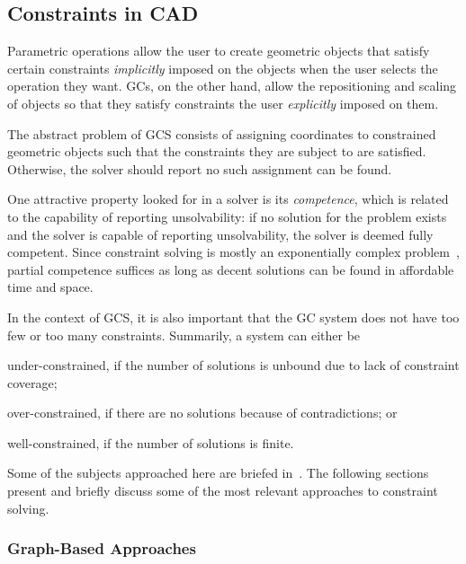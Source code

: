 \subsection{Constraints in CAD}%
\label{sec:intro.constraints}

Parametric operations allow the user to create geometric objects that satisfy
certain constraints \emph{implicitly} imposed on the objects when the user
selects the operation they want.  \Acp{GC}, on the other hand, allow the
repositioning and scaling of objects so that they satisfy constraints the user
\emph{explicitly} imposed on them.

The abstract problem of \ac{GCS} consists of assigning coordinates to
constrained geometric objects such that the constraints they are subject to are
satisfied.  Otherwise, the solver should report no such assignment can be found.

One attractive property looked for in a solver is its \emph{competence}, which
is related to the capability of reporting unsolvability: if no solution for the
problem exists and the solver is capable of reporting unsolvability, the solver
is deemed fully competent.  Since constraint solving is mostly an exponentially
complex problem~\cite{Rossi:2006:Handbook}, partial competence suffices as long
as decent solutions can be found in affordable time and space.

In the context of \ac{GCS}, it is also important that the \ac{GC} system does
not have too few or too many constraints.  Summarily, a system can either be 
\begin{enumerate*}[label= (\arabic*)]
  \item under-constrained, if the number of solutions is unbound due to lack of
  constraint coverage;
  \item over-constrained, if there are no solutions because of contradictions;
  or
  \item well-constrained, if the number of solutions is finite.
\end{enumerate*}

Some of the subjects approached here are briefed in~\cite{Hoffmann:2005:BCS}.
The following sections present and briefly discuss some of the most relevant
approaches to constraint solving.

\subsubsection{Graph-Based Approaches}%
\label{sec:intro.constraints.graph}

